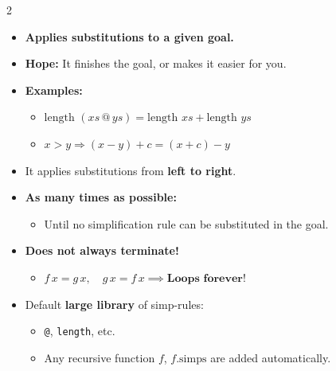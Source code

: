 \documentclass[9pt,a4paper]{extarticle}
\begin{document}
\begin{multicols*}{2}

\begin{tcolorbox}[title=1. Simplification (\texttt{simp})]
\begin{itemize}[leftmargin=1em, itemsep=1.5pt]
    \item \textbf{Applies substitutions to a given goal.}
    \item \textbf{Hope:} It finishes the goal, or makes it easier for you.
    \item \textbf{Examples:}
    \begin{itemize}[leftmargin=0.8em, label=$\bullet$, itemsep=0pt]
        \item $\text{length }(xs \mathbin{@} ys) = \text{length } xs + \text{length } ys$
        \item $x > y \Longrightarrow (x - y) + c = (x + c) - y$
    \end{itemize}
    \item It applies substitutions from \textbf{left to right}.
    \item \textbf{As many times as possible:}
    \begin{itemize}[leftmargin=0.8em, label=--, itemsep=0pt]
        \item Until no simplification rule can be substituted in the goal.
    \end{itemize}
    \item \textbf{Does not always terminate!}
    \begin{itemize}[leftmargin=0.8em, label=$\text{E.g.}$, itemsep=0pt]
        \item $f\,x = g\,x, \quad g\,x = f\,x \implies \textbf{Loops forever!}$
    \end{itemize}
    
    \begin{center}
    \vspace{-0.3em}
    \vspace{-0.4em}
    \end{center}

    \item Default \textbf{large library} of simp-rules:
    \begin{itemize}[leftmargin=0.8em, label=$\bullet$, itemsep=0pt]
        \item \texttt{@}, \texttt{length}, etc.
        \item Any recursive function $f$, $f.\text{simps}$ are added automatically.
    \end{itemize}
    

\end{itemize}
\end{tcolorbox}
\end{multicols*}
\end{document}
